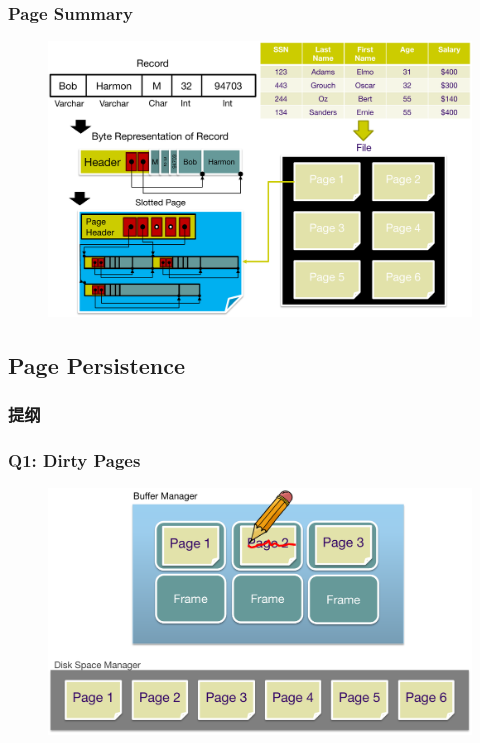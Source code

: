 \begin{frame}[fragile]
	\frametitle{Page Summary}
	\begin{figure}
		\includegraphics[width=.68\linewidth]{figs/dbfile-page-summary.pdf}
	\end{figure}
\end{frame}


\subsection{Page Persistence}

\begin{frame}
\frametitle{提纲} %
\tableofcontents %

\end{frame}

\begin{frame}[fragile]
	\frametitle{Q1: Dirty Pages}
	\begin{figure}
		\includegraphics[width=.68\linewidth]{figs/dbfile-dirtypage.pdf}
	\end{figure}
\end{frame}

